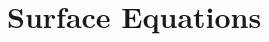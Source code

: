 \documentclass{article}
\newcommand{\Sm}{\mathbb{S}}
\newcommand{\Ym}{\mathbb{Y}}
\newcommand{\Bm}{\mathbb{B}}
\renewcommand{\L}{\mathbf{\mathcal{L}}}
\newcommand{\R}{\mathbf{\mathcal{R}}}
\newcommand{\0}{\varnothing}
\newcommand{\I}{\mathbb{I}}
\newcommand{\Ev}{\mathbb{E}}
\newcommand{\Jv}{\mathbb{J}}
\newcommand{\Hv}{\mathbb{H}}
\newcommand{\Kv}{\mathbb{K}}
\newcommand{\SLm}{\mathbb{S}^\L}
\newcommand{\SRm}{\mathbb{S}^\R}
\newcommand{\Chibb}{\mathbb{X}}
\newcommand{\N}{\mathbb{\hat N}}
\begin{document}


\section{Surface Equations}
\end{document}
